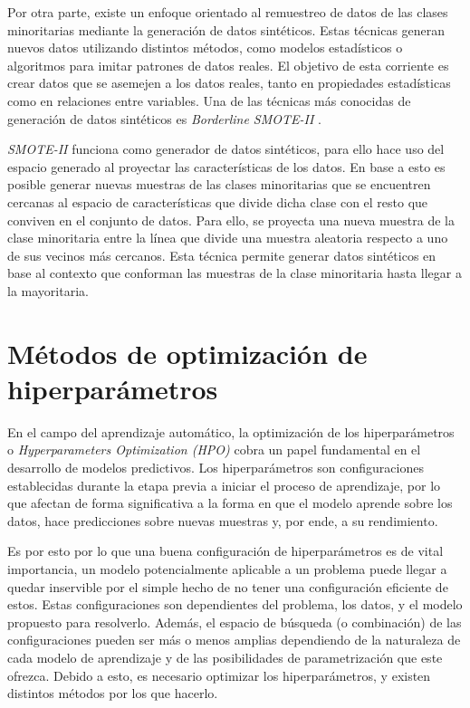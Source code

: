 Por otra parte, existe un enfoque orientado al remuestreo de datos de las clases minoritarias mediante la generación de datos sintéticos. Estas técnicas generan nuevos datos utilizando distintos métodos, como modelos estadísticos o algoritmos para imitar patrones de datos reales. El objetivo de esta corriente es crear datos que se asemejen a los datos reales, tanto en propiedades estadísticas como en relaciones entre variables. Una de las técnicas más conocidas de generación de datos sintéticos es \textit{Borderline SMOTE-II} \cite{han2005borderline}.

\textit{SMOTE-II} funciona como generador de datos sintéticos, para ello hace uso del espacio generado al proyectar las características de los datos. En base a esto es posible generar nuevas muestras de las clases minoritarias que se encuentren cercanas al espacio de características que divide dicha clase con el resto que conviven en el conjunto de datos. Para ello, se proyecta una nueva muestra de la clase minoritaria entre la línea que divide una muestra aleatoria respecto a uno de sus vecinos más cercanos. Esta técnica permite generar datos sintéticos en base al contexto que conforman las muestras de la clase minoritaria hasta llegar a la mayoritaria.

\section{Métodos de optimización de hiperparámetros}
\label{HYPERPARAMETERS_OPTIMIZATION_METHODS}

En el campo del aprendizaje automático, la optimización de los hiperparámetros o \textit{Hyperparameters Optimization (HPO)} cobra un papel fundamental en el desarrollo de modelos predictivos. Los hiperparámetros son configuraciones establecidas durante la etapa previa a iniciar el proceso de aprendizaje, por lo que afectan de forma significativa a la forma en que el modelo aprende sobre los datos, hace predicciones sobre nuevas muestras y, por ende, a su rendimiento.

Es por esto por lo que una buena configuración de hiperparámetros es de vital importancia, un modelo potencialmente aplicable a un problema puede llegar a quedar inservible por el simple hecho de no tener una configuración eficiente de estos. Estas configuraciones son dependientes del problema, los datos, y el modelo propuesto para resolverlo. Además, el espacio de búsqueda (o combinación) de las configuraciones pueden ser más o menos amplias dependiendo de la naturaleza de cada modelo de aprendizaje y de las posibilidades de parametrización que este ofrezca. Debido a esto, es necesario optimizar los hiperparámetros, y existen distintos métodos por los que hacerlo.

